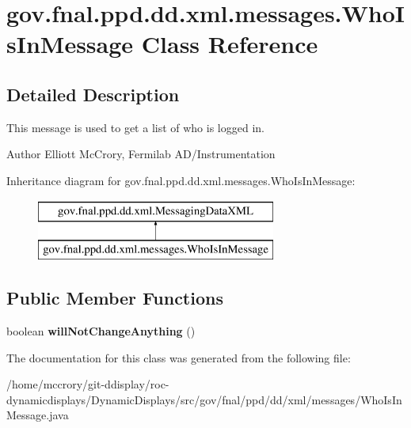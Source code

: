 \hypertarget{classgov_1_1fnal_1_1ppd_1_1dd_1_1xml_1_1messages_1_1WhoIsInMessage}{\section{gov.\-fnal.\-ppd.\-dd.\-xml.\-messages.\-Who\-Is\-In\-Message Class Reference}
\label{classgov_1_1fnal_1_1ppd_1_1dd_1_1xml_1_1messages_1_1WhoIsInMessage}
}


\subsection{Detailed Description}
This message is used to get a list of who is logged in.

\begin{DoxyAuthor}{Author}
Elliott Mc\-Crory, Fermilab A\-D/\-Instrumentation 
\end{DoxyAuthor}
Inheritance diagram for gov.\-fnal.\-ppd.\-dd.\-xml.\-messages.\-Who\-Is\-In\-Message\-:\begin{figure}[H]
\begin{center}
\leavevmode
\includegraphics[height=2.000000cm]{classgov_1_1fnal_1_1ppd_1_1dd_1_1xml_1_1messages_1_1WhoIsInMessage}
\end{center}
\end{figure}
\subsection*{Public Member Functions}
\begin{DoxyCompactItemize}
\item 
\hypertarget{classgov_1_1fnal_1_1ppd_1_1dd_1_1xml_1_1messages_1_1WhoIsInMessage_a94708dd1583a22b4779d3f3f1ecad023}{boolean {\bfseries will\-Not\-Change\-Anything} ()}\label{classgov_1_1fnal_1_1ppd_1_1dd_1_1xml_1_1messages_1_1WhoIsInMessage_a94708dd1583a22b4779d3f3f1ecad023}

\end{DoxyCompactItemize}


The documentation for this class was generated from the following file\-:\begin{DoxyCompactItemize}
\item 
/home/mccrory/git-\/ddisplay/roc-\/dynamicdisplays/\-Dynamic\-Displays/src/gov/fnal/ppd/dd/xml/messages/Who\-Is\-In\-Message.\-java\end{DoxyCompactItemize}
